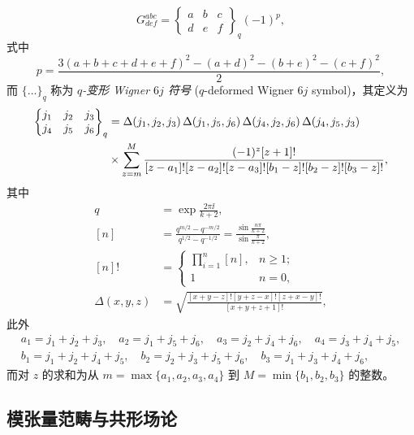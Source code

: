 \begin{equation}
  G^{abc}_{def} = \begin{Bmatrix} a & b & c \\ d & e & f \end{Bmatrix}_q (-1)^p,
\end{equation}
式中
\begin{equation}
  p = \frac{3(a+b+c+d+e+f)^2 - (a+d)^2 - (b+e)^2 - (c+f)^2}{2},
\end{equation}
而 $\{\dots\}_q$ 称为 \emph{$q$-变形 Wigner $6j$ 符号} ($q$-deformed Wigner $6j$ symbol)，其定义为
\begin{align}
  \begin{Bmatrix} j_1 & j_2 & j_3 \\ j_4 & j_5 & j_6 \end{Bmatrix}_q
  &= \Delta(j_1,j_2,j_3) \, \Delta(j_1,j_5,j_6) \, \Delta(j_4,j_2,j_6) \, \Delta(j_4,j_5,j_3) \notag \\
  &\times \sum_{z=m}^M \frac{(-1)^z [z+1]!}{[z-a_1]![z-a_2]![z-a_3]! [b_1-z]![b_2-z]![b_3-z]!},
\end{align}
其中
\begin{align}
  q    &= \exp\frac{2\pi\ii}{k+2}, \\
  [n]  &= \frac{q^{m/2} - q^{-m/2}}{q^{1/2} - q^{-1/2}} = \frac{\sin\frac{n\pi}{k+2}}{\sin\frac{\pi}{k+2}}, \\
  [n]! &= \begin{cases}
    \prod_{i=1}^{n} [n], & n \geqslant 1; \\
    1                    & n = 0,
  \end{cases} \\
  \Delta(x,y,z) &= \sqrt{\frac{[x+y-z]! [y+z-x]! [z+x-y]!}{[x+y+z+1]!}},
\end{align}
此外
\begin{equation}
  \begin{gathered}
    a_1=j_1+j_2+j_3, \quad a_2=j_1+j_5+j_6, \quad a_3=j_2+j_4+j_6, \quad a_4=j_3+j_4+j_5, \\
    b_1=j_1+j_2+j_4+j_5, \quad b_2=j_2+j_3+j_5+j_6, \quad b_3=j_1+j_3+j_4+j_6,
  \end{gathered}
\end{equation}
而对 $z$ 的求和为从 $m=\max\{a_1,a_2,a_3,a_4\}$ 到 $M=\min\{b_1,b_2,b_3\}$ 的整数。

\subsection{模张量范畴与共形场论}

